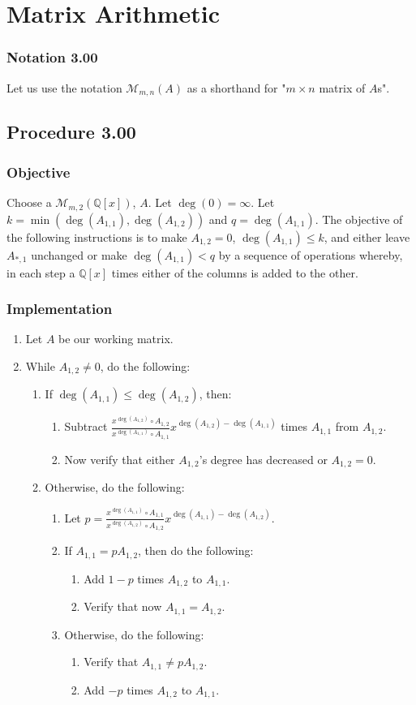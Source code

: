 \documentclass[twocolumn]{article}
\newcommand{\notation}[1]{\subsubsection*{Notation #1}}
\newcommand{\procedure}[2][]{\subsection*{Procedure #2 \ifthenelse{\equal{#1}{}}{}{(#1)}}\label{sec:procedure #2}}
\newcommand{\objective}{\subsubsection*{Objective}}
\newcommand{\implementation}{\subsubsection*{Implementation}}
\begin{document}
	\section{Matrix Arithmetic}
		\notation{3.00}
			Let us use the notation $\mathcal{M}_{m,n}(A)$ as a shorthand for "$m\times n$ matrix of $A$s".
		\procedure{3.00}
			\objective
				Choose a $\mathcal{M}_{m,2}(\mathbb{Q}[x])$, $A$. Let $\deg(0)=\infty$. Let $k=\min(\deg(A_{1,1}),\deg(A_{1,2}))$ and $q=\deg(A_{1,1})$. The objective of the following instructions is to make $A_{1,2}=0$, $\deg(A_{1,1})\le k$, and either leave $A_{*,1}$ unchanged or make $\deg(A_{1,1})<q$ by a sequence of operations whereby, in each step a $\mathbb{Q}[x]$ times either of the columns is added to the other.
			\implementation
				\begin{enumerate}
					\item Let $A$ be our working matrix.
					\item While $A_{1,2}\ne 0$, do the following:
					\begin{enumerate}
						\item If $\deg(A_{1,1})\le\deg(A_{1,2})$, then:
						\begin{enumerate}
							\item Subtract $\frac{x^{\deg(A_{1,2})}\circ A_{1,2}}{x^{\deg(A_{1,1})}\circ A_{1,1}}x^{\deg(A_{1,2})-\deg(A_{1,1})}$ times $A_{1,1}$ from $A_{1,2}$.
							\item Now verify that either $A_{1,2}$'s degree has decreased or $A_{1,2}=0$.
						\end{enumerate}
						\item Otherwise, do the following:
						\begin{enumerate}
							\item Let $p=\frac{x^{\deg(A_{1,1})}\circ A_{1,1}}{x^{\deg(A_{1,2})}\circ A_{1,2}}x^{\deg(A_{1,1})-\deg(A_{1,2})}$.
							\item If $A_{1,1}=pA_{1,2}$, then do the following:
							\begin{enumerate}
								\item Add $1-p$ times $A_{1,2}$ to $A_{1,1}$.
								\item Verify that now $A_{1,1}=A_{1,2}$.
							\end{enumerate}
							\item Otherwise, do the following:
							\begin{enumerate}
								\item Verify that $A_{1,1}\ne pA_{1,2}$.
								\item Add $-p$ times $A_{1,2}$ to $A_{1,1}$.

\end{enumerate}
\end{enumerate}
\end{enumerate}
\end{enumerate}
\end{document}
